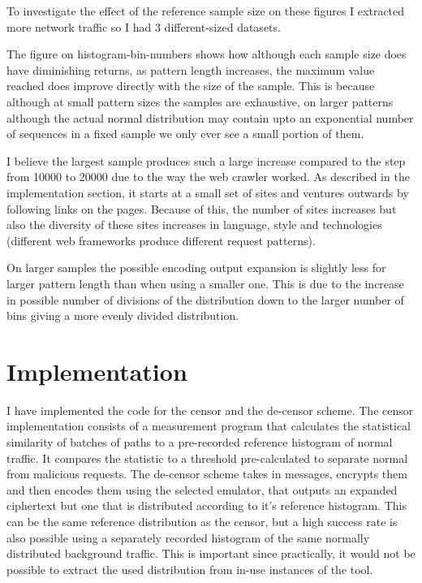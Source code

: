 \documentclass[10pt,a4paper]{article}
\begin{document}
To investigate the effect of the reference sample size on these figures I extracted more network traffic so I had 3 different-sized datasets.

The figure on histogram-bin-numbers shows how although each sample size does have diminishing returns, as pattern length increases, the maximum value reached does improve directly with the size of the sample. This is because although at small pattern sizes the samples are exhaustive, on larger patterns although the actual normal distribution may contain upto an exponential number of sequences in a fixed sample we only ever see a small portion of them. 

I believe the largest sample produces such a large increase compared to the step from 10000 to 20000 due to the way the web crawler worked.
As described in the implementation section, it starts at a small set of sites and ventures outwards by following links on the pages.
Because of this, the number of sites increases but also the diversity of these sites increases in language, style and technologies (different web frameworks produce different request patterns).

On larger samples the possible encoding output expansion is slightly less for larger pattern length than when using a smaller one. This is due to the increase in possible number of divisions of the distribution down to the larger number of bins giving a more evenly divided distribution.

\pagebreak
\section{Implementation}


I have implemented the code for the censor and the de-censor scheme. The censor implementation consists of a measurement program that calculates the statistical similarity of batches of paths to a pre-recorded reference histogram of normal traffic. It compares the statistic to a threshold pre-calculated to separate normal from malicious requests. The de-censor scheme takes in messages, encrypts them and then encodes them using the selected emulator, that outputs an expanded ciphertext but one that is distributed according to it's reference histogram. This can be the same reference distribution as the censor, but a high success rate is also possible using a separately recorded histogram of the same normally distributed background traffic. This is important since practically, it would not be possible to extract the used distribution from in-use instances of the tool.
\end{document}
